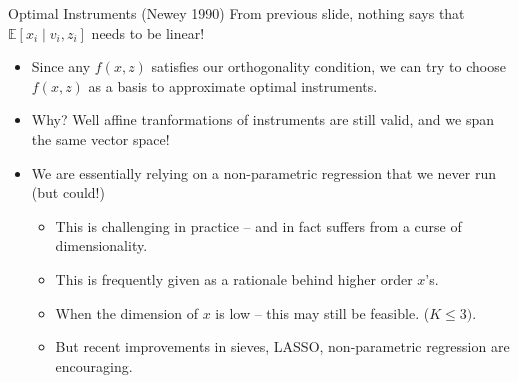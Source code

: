\documentclass[aspectratio=169,11pt]{beamer}
\begin{document}
\begin{frame}{Optimal Instruments (Newey 1990)}
From previous slide, nothing says that $\mathbb{E}\left[x_i \mid v_i, z_i \right]$ needs to be \alert{linear}!
\begin{itemize}
\item Since any $f(x,z)$ satisfies our orthogonality condition, we can try to choose $f(x,z)$ as a \alert{basis} to approximate optimal instruments.
\item Why? Well affine tranformations of instruments are still valid, and we span the same vector space!
\item We are essentially relying on a non-parametric regression that we never run (but could!)
\begin{itemize}
\item This is challenging in practice -- and in fact suffers from a curse of dimensionality.
\item This is frequently given as a rationale behind higher order $x$'s.
\item When the dimension of $x$ is low -- this may still be feasible. ($K \leq 3)$.
\item But recent improvements in sieves, LASSO, non-parametric regression are encouraging.
\end{itemize}
\end{itemize}
\end{frame}
\end{document}
